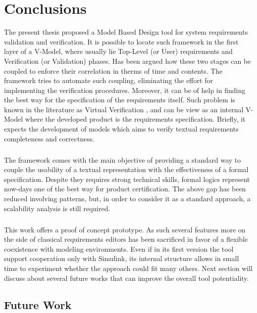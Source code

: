 \chapter{Conclusions}


The present thesis proposed a Model Based Design tool for system requirements validation and verification. It is possible to locate such framework in the first layer of a V-Model, where usually lie Top-Level (or User) requirements and Verification (or Validation) phases. Has been argued how these two stages can be coupled to enforce their correlation in therms of time and contents. The framework tries to automate such coupling, eliminating the effort for implementing the verification procedures. Moreover, it can be of help in finding the best way for the specification of the requirements itself. Such problem is known in the literature as Virtual Verification \citep{schamai2010virtual}, and can be view as an internal V-Model where the developed product is the requirements specification. Briefly, it expects the development of models which aims to verify textual requirements completeness and correctness.
\paragraph{} The framework comes with the main objective of providing a standard way to couple the usability of a textual representation with the effectiveness of a formal specification. Despite they requires strong technical skills, formal logics represent now-days one of the best way for product certification. The above gap has been reduced involving patterns, but, in order to consider it as a standard approach, a scalability analysis is still required.
\paragraph{} This work offers a proof of concept prototype. As such several features more on the side of classical requirements editors has been sacrificed in favor of a flexible coexistence with modeling environments. Even if in its first version the tool support cooperation only with Simulink, its internal structure allows in small time to experiment whether the approach could fit many others. Next section will discuss about several future works that can improve the overall tool potentiality.

\section{Future Work}

